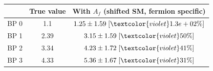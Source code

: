 \begin{tabular}{c||c|c|}
 & True value & With $A_f$ (shifted SM, 
fermion specific)\\
\hline\hline
BP 0 & 1.1 & $1.25\pm1.59\;[\textcolor{violet}{1.3e+02\%}]$\\\hline
BP 1 & 2.39 & $3.15\pm1.59\;[\textcolor{violet}{50\%}]$\\\hline
BP 2 & 3.34 & $4.23\pm1.72\;[\textcolor{violet}{41\%}]$\\\hline
BP 3 & 4.33 & $5.36\pm1.67\;[\textcolor{violet}{31\%}]$\\
\end{tabular}

